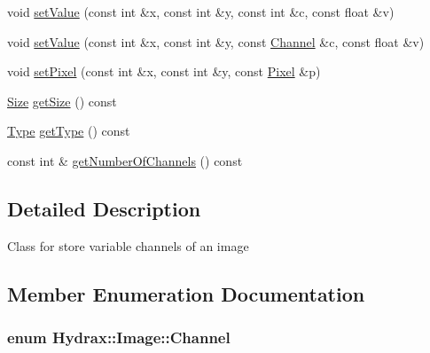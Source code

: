 \begin{CompactItemize}
\begin{CompactItemize}
\item 
void \hyperlink{class_hydrax_1_1_image_ddfd822a7b6663233d1bb1c3e691bb50}{setValue} (const int \&x, const int \&y, const int \&c, const float \&v)
\item 
void \hyperlink{class_hydrax_1_1_image_51f4bfd3291592dac969f51c52ca1009}{setValue} (const int \&x, const int \&y, const \hyperlink{class_hydrax_1_1_image_89b5fe40f19103fd27240511665344df}{Channel} \&c, const float \&v)
\item 
void \hyperlink{class_hydrax_1_1_image_57b7ae07e51805b2744b5d21c0412ecd}{setPixel} (const int \&x, const int \&y, const \hyperlink{struct_hydrax_1_1_image_1_1_pixel}{Pixel} \&p)
\item 
\hyperlink{struct_hydrax_1_1_size}{Size} \hyperlink{class_hydrax_1_1_image_06a882ca6cfb5f4c65d64b820e55c384}{getSize} () const 
\item 
\hyperlink{class_hydrax_1_1_image_1dab7f4b50bbbf4eb5a5b55c46defced}{Type} \hyperlink{class_hydrax_1_1_image_b39de4a80c2c0bf18c7128a8de80c048}{getType} () const 
\item 
const int \& \hyperlink{class_hydrax_1_1_image_f11bfbc9071c67c038dd0835628908f2}{getNumberOfChannels} () const 
\end{CompactItemize}


\subsection{Detailed Description}
Class for store variable channels of an image 

\subsection{Member Enumeration Documentation}
\hypertarget{class_hydrax_1_1_image_89b5fe40f19103fd27240511665344df}{
\subsubsection[{Channel}]{\setlength{\rightskip}{0pt plus 5cm}enum {\bf Hydrax::Image::Channel}}}
\label{class_hydrax_1_1_image_89b5fe40f19103fd27240511665344df}



\end{CompactItemize}
